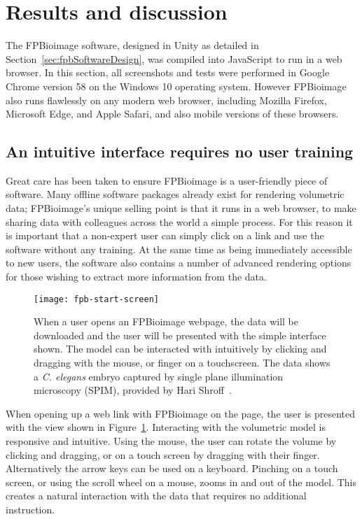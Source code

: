 \section{Results and discussion} \label{sec:fpbResults}
The FPBioimage software, designed in Unity as detailed in Section~\ref{sec:fpbSoftwareDesign}, was compiled into JavaScript to run in a web browser.
In this section, all screenshots and tests were performed in Google Chrome version 58 on the Windows 10 operating system.
However FPBioimage also runs flawlessly on any modern web browser, including Mozilla Firefox, Microsoft Edge, and Apple Safari, and also mobile versions of these browsers.

\subsection{An intuitive interface requires no user training}
Great care has been taken to ensure FPBioimage is a user-friendly piece of software.
Many offline software packages already exist for rendering volumetric data; FPBioimage's unique selling point is that it runs in a web browser, to make sharing data with colleagues across the world a simple process.
For this reason it is important that a non-expert user can simply click on a link and use the software without any training.
At the same time as being immediately accessible to new users, the software also contains a number of advanced rendering options for those wishing to extract more information from the data.

\begin{figure}[htbp!]
\centering
\texttt{[image: fpb-start-screen]}
\caption[FPBioimage: Users are presented with a simple interface which is intuitive to use]{When a user opens an FPBioimage webpage, the data will be downloaded and the user will be presented with the simple interface shown. The model can be interacted with intuitively by clicking and dragging with the mouse, or finger on a touchscreen. The data shows a \textit{C. elegans} embryo captured by single plane illumination microscopy (SPIM), provided by Hari Shroff~\cite{kumar2014dual}. }
\label{fig:FPBhome}
\end{figure}

When opening up a web link with FPBioimage on the page, the user is presented with the view shown in Figure~\ref{fig:FPBhome}.
Interacting with the volumetric model is responsive and intuitive.
Using the mouse, the user can rotate the volume by clicking and dragging, or on a touch screen by dragging with their finger.
Alternatively the arrow keys can be used on a keyboard.
Pinching on a touch screen, or using the scroll wheel on a mouse, zooms in and out of the model.
This creates a natural interaction with the data that requires no additional instruction.

